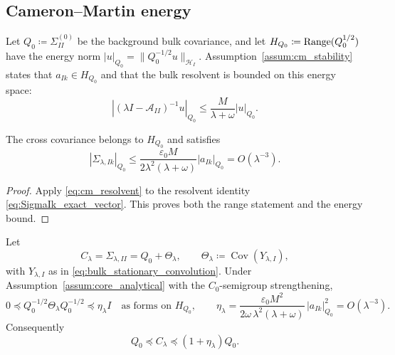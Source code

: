 \subsection{Cameron--Martin energy}

Let $Q_0\coloneqq\Sigma_{II}^{(0)}$ be the background bulk covariance, and let
$H_{Q_0}\coloneqq\operatorname{Range}(Q_0^{1/2})$ have the energy norm
$|u|_{Q_0}=\|Q_0^{-1/2}u\|_{\mathcal{H}_I}$.  Assumption~\ref{assum:cm_stability}
states that $a_{Ik}\in H_{Q_0}$ and that the bulk resolvent is bounded on this
energy space:
\begin{equation}
  |(\lambda I-\mathcal{A}_{II})^{-1}u|_{Q_0}
  \le \frac{M}{\lambda+\omega}|u|_{Q_0}.
  \label{eq:cm_resolvent}
\end{equation}

\begin{lemma}
\label{lem:finite_energy_leakage}
The cross covariance belongs to $H_{Q_0}$ and satisfies
\begin{equation}
 |\Sigma_{\lambda,Ik}|_{Q_0}
 \le
 \frac{\varepsilon_0M}{2\lambda^2(\lambda+\omega)}
 |a_{Ik}|_{Q_0}
 =O(\lambda^{-3}).
 \label{eq:cross_energy}
\end{equation}
\end{lemma}

\begin{proof}
Apply \eqref{eq:cm_resolvent} to the resolvent identity
\eqref{eq:SigmaIk_exact_vector}.  This proves both the range statement and the
energy bound.
\end{proof}

\begin{lemma}
\label{lem:relative_form_bound}
Let
\[
  C_\lambda=\Sigma_{\lambda,II}=Q_0+\Theta_\lambda,
  \qquad
  \Theta_\lambda\coloneqq\operatorname{Cov}(Y_{\lambda,I}),
\]
with $Y_{\lambda,I}$ as in \eqref{eq:bulk_stationary_convolution}.  Under
Assumption~\ref{assum:core_analytical} with the $C_0$-semigroup strengthening,
\begin{equation}
  0\preceq Q_0^{-1/2}\Theta_\lambda Q_0^{-1/2}\preceq \eta_\lambda I
  \quad\text{as forms on }H_{Q_0},
  \qquad
  \eta_\lambda
  =\frac{\varepsilon_0 M^2}{2\omega\,\lambda^2(\lambda+\omega)}\,|a_{Ik}|_{Q_0}^2
  =O(\lambda^{-3}).
  \label{eq:relative_form_bound}
\end{equation}
Consequently
\begin{equation}
  Q_0\preceq C_\lambda\preceq (1+\eta_\lambda)Q_0 .
  \label{eq:two_sided_loewner}
\end{equation}
\end{lemma}

